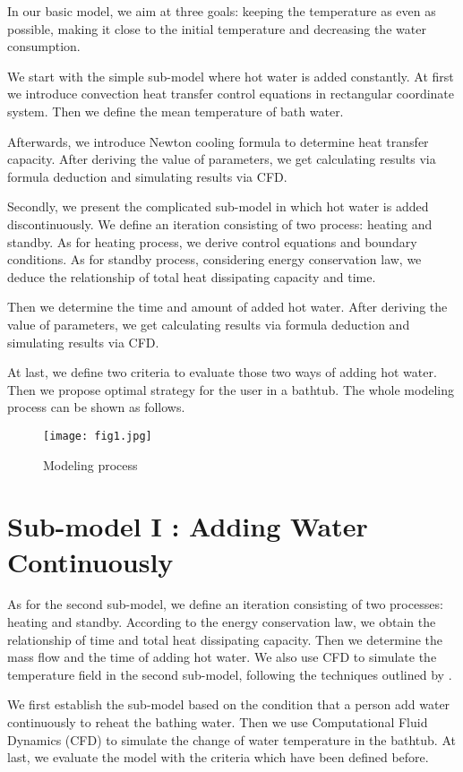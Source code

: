 \documentclass{mcmthesis}
\begin{document}
In our basic model, we aim at three goals: keeping the temperature as even as 
possible, making it close to the initial temperature and decreasing the water 
consumption.

We start with the simple sub-model where hot water is added constantly.
At first we introduce convection heat transfer control equations in rectangular 
coordinate system. Then we define the mean temperature of bath water.

Afterwards, we introduce Newton cooling formula to determine heat transfer
capacity. After deriving the value of parameters, we get calculating results 
via formula deduction and simulating results via CFD.

Secondly, we present the complicated sub-model in which hot water is
added discontinuously. We define an iteration consisting of two process:
heating and standby. As for heating process, we derive control equations and 
boundary conditions. As for standby process, considering energy conservation law, 
we deduce the relationship of total heat dissipating capacity and time.

Then we determine the time and amount of added hot water. After deriving the 
value of parameters, we get calculating results via formula deduction and 
simulating results via CFD.

At last, we define two criteria to evaluate those two ways of adding hot water. 
Then we propose optimal strategy for the user in a bathtub.
The whole modeling process can be shown as follows.

\begin{figure}[h] 
\centering
\texttt{[image: fig1.jpg]}
\caption{Modeling process} \label{fig1}
\end{figure}

\section{Sub-model I : Adding Water Continuously}

As for the second sub-model, we define an iteration consisting of two processes: 
heating and standby. According to the energy conservation law, we obtain the 
relationship of time and total heat dissipating capacity. Then we determine 
the mass flow and the time of adding hot water. We also use CFD to simulate 
the temperature field in the second sub-model, following the techniques 
outlined by \textcite{website2024}.

We first establish the sub-model based on the condition that a person add water 
continuously to reheat the bathing water. Then we use Computational Fluid 
Dynamics (CFD) to simulate the change of water temperature in the bathtub. At 
last, we evaluate the model with the criteria which have been defined before.
\end{document}

